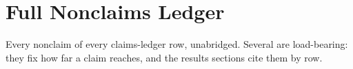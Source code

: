 \section{Full Nonclaims Ledger}
\label{app:nonclaims}

Every nonclaim of every claims-ledger row, unabridged. Several are load-bearing: they fix how far
a claim reaches, and the results sections cite them by row.

{\small

}
